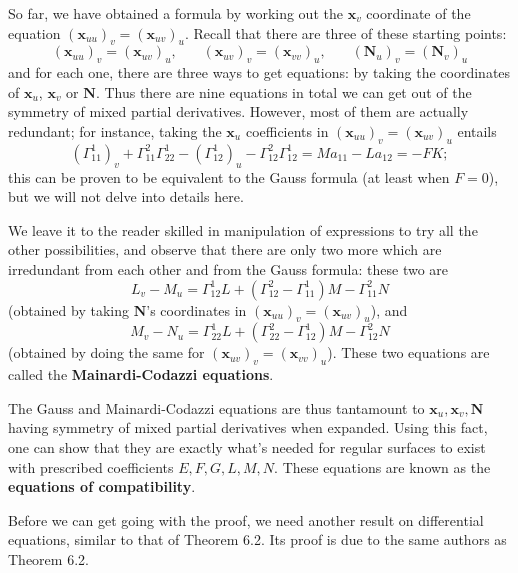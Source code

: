 \documentclass[leqno]{book}
\begin{document}
So far, we have obtained a formula by working out the $\mathbf x_v$ coordinate of the equation $(\mathbf x_{uu})_v=(\mathbf x_{uv})_u$.  Recall that there are three of these starting points:
$$(\mathbf x_{uu})_v=(\mathbf x_{uv})_u,~~~~~~~~(\mathbf x_{uv})_v=(\mathbf x_{vv})_u,~~~~~~~~(\mathbf N_u)_v=(\mathbf N_v)_u$$
and for each one, there are three ways to get equations: by taking the coordinates of $\mathbf x_u$, $\mathbf x_v$ or $\mathbf N$.  Thus there are nine equations in total we can get out of the symmetry of mixed partial derivatives.  However, most of them are actually redundant; for instance, taking the $\mathbf x_u$ coefficients in $(\mathbf x_{uu})_v=(\mathbf x_{uv})_u$ entails
$$(\Gamma_{11}^1)_v+\Gamma_{11}^2\Gamma_{22}^1-(\Gamma_{12}^1)_u-\Gamma_{12}^2\Gamma_{12}^1=Ma_{11}-La_{12}=-FK;$$
this can be proven to be equivalent to the Gauss formula (at least when $F=0$), but we will not delve into details here.  

We leave it to the reader skilled in manipulation of expressions to try all the other possibilities, and observe that there are only two more which are irredundant from each other and from the Gauss formula: these two are
$$L_v-M_u=\Gamma_{12}^1L+(\Gamma_{12}^2-\Gamma_{11}^1)M-\Gamma_{11}^2N$$
(obtained by taking $\mathbf N$'s coordinates in $(\mathbf x_{uu})_v=(\mathbf x_{uv})_u$), and
$$M_v-N_u=\Gamma_{22}^1L+(\Gamma_{22}^2-\Gamma_{12}^1)M-\Gamma_{12}^2N$$
(obtained by doing the same for $(\mathbf x_{uv})_v=(\mathbf x_{vv})_u$).  These two equations are called the \textbf{Mainardi-Codazzi equations}.

The Gauss and Mainardi-Codazzi equations are thus tantamount to $\mathbf x_u,\mathbf x_v,\mathbf N$ having symmetry of mixed partial derivatives when expanded.  Using this fact, one can show that they are exactly what's needed for regular surfaces to exist with prescribed coefficients $E,F,G,L,M,N$.  These equations are known as the \textbf{equations of compatibility}.

Before we can get going with the proof, we need another result on differential equations, similar to that of Theorem 6.2.  Its proof is due to the same authors as Theorem 6.2.\\
\end{document}
